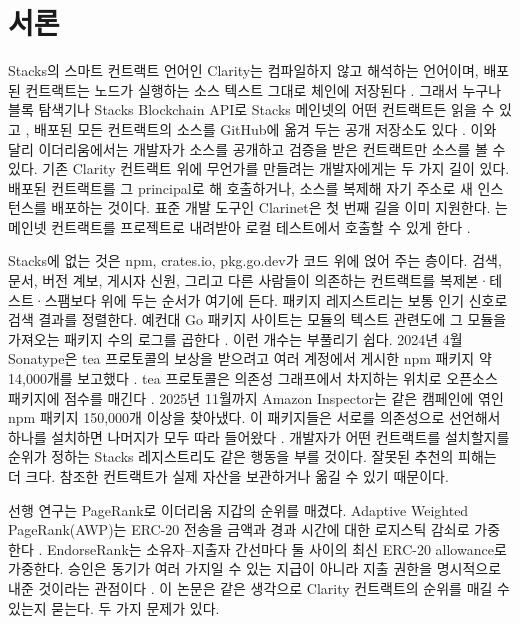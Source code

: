 \section{서론}
\label{sec:introduction}

Stacks의 스마트 컨트랙트 언어인 Clarity는 컴파일하지 않고 해석하는 언어이며, 배포된 컨트랙트는 노드가 실행하는 소스 텍스트 그대로 체인에 저장된다 \cite{sip002,hiro2024nowhere}. 그래서 누구나 블록 탐색기나 Stacks Blockchain API로 Stacks 메인넷의 어떤 컨트랙트든 읽을 수 있고 \cite{hiroapi}, 배포된 모든 컨트랙트의 소스를 GitHub에 옮겨 두는 공개 저장소도 있다 \cite{boomcrypto}. 이와 달리 이더리움에서는 개발자가 소스를 공개하고 검증을 받은 컨트랙트만 소스를 볼 수 있다. 기존 Clarity 컨트랙트 위에 무언가를 만들려는 개발자에게는 두 가지 길이 있다. 배포된 컨트랙트를 그 principal로 해 호출하거나, 소스를 복제해 자기 주소로 새 인스턴스를 배포하는 것이다. 표준 개발 도구인 Clarinet은 첫 번째 길을 이미 지원한다. 는 메인넷 컨트랙트를 프로젝트로 내려받아 로컬 테스트에서 호출할 수 있게 한다 \cite{clarinet}.

Stacks에 없는 것은 npm, crates.io, pkg.go.dev가 코드 위에 얹어 주는 층이다. 검색, 문서, 버전 계보, 게시자 신원, 그리고 다른 사람들이 의존하는 컨트랙트를 복제본·테스트·스팸보다 위에 두는 순서가 여기에 든다. 패키지 레지스트리는 보통 인기 신호로 검색 결과를 정렬한다. 예컨대 Go 패키지 사이트는 모듈의 텍스트 관련도에 그 모듈을 가져오는 패키지 수의 로그를 곱한다 \cite{pkgsite}. 이런 개수는 부풀리기 쉽다. 2024년 4월 Sonatype은 tea 프로토콜의 보상을 받으려고 여러 계정에서 게시한 npm 패키지 약 14,000개를 보고했다 \cite{sonatype2024tea}. tea 프로토콜은 의존성 그래프에서 차지하는 위치로 오픈소스 패키지에 점수를 매긴다 \cite{tea2022}. 2025년 11월까지 Amazon Inspector는 같은 캠페인에 엮인 npm 패키지 150,000개 이상을 찾아냈다. 이 패키지들은 서로를 의존성으로 선언해서 하나를 설치하면 나머지가 모두 따라 들어왔다 \cite{aws2025tea}. 개발자가 어떤 컨트랙트를 설치할지를 순위가 정하는 Stacks 레지스트리도 같은 행동을 부를 것이다. 잘못된 추천의 피해는 더 크다. 참조한 컨트랙트가 실제 자산을 보관하거나 옮길 수 있기 때문이다.

선행 연구는 PageRank로 이더리움 지갑의 순위를 매겼다. Adaptive Weighted PageRank(AWP)는 ERC-20 전송을 금액과 경과 시간에 대한 로지스틱 감쇠로 가중한다 \cite{do2023awp}. EndorseRank는 소유자--지출자 간선마다 둘 사이의 최신 ERC-20 allowance로 가중한다. 승인은 동기가 여러 가지일 수 있는 지급이 아니라 지출 권한을 명시적으로 내준 것이라는 관점이다 \cite{kwon2026endorserank}. 이 논문은 같은 생각으로 Clarity 컨트랙트의 순위를 매길 수 있는지 묻는다. 두 가지 문제가 있다.

